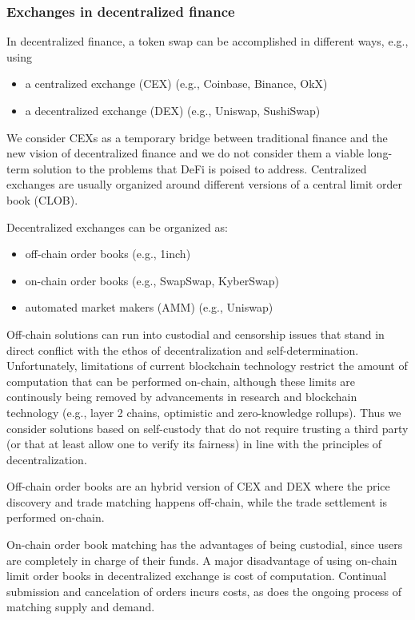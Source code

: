 \documentclass[11pt, reqno]{amsart}
\theoremstyle{definition}
\theoremstyle{remark}
\begin{document}
\subsubsection{Exchanges in decentralized finance}
In decentralized finance, a token swap can be accomplished in different ways,
e.g., using
\begin{itemize}
	\item a centralized exchange (CEX) (e.g., Coinbase, Binance, OkX)
	\item a decentralized exchange (DEX) (e.g., Uniswap, SushiSwap)
\end{itemize}

We consider CEXs as a temporary bridge between traditional finance and the
new vision of decentralized finance and we do not consider them a viable
long-term solution to the problems that DeFi is poised to address.
Centralized exchanges are usually organized around different versions of a
central limit order book (CLOB).

Decentralized exchanges can be organized as:
\begin{itemize}
	\item off-chain order books (e.g., 1inch)
	\item on-chain order books (e.g., SwapSwap, KyberSwap)
	\item automated market makers (AMM) (e.g., Uniswap)
\end{itemize}

Off-chain solutions can run into custodial and censorship issues that stand
in direct conflict with the ethos of decentralization and self-determination.
Unfortunately, limitations of current blockchain technology restrict
the amount of computation that can be performed on-chain, although these limits
are continously being removed by advancements in research and blockchain
technology (e.g., layer 2 chains, optimistic and zero-knowledge rollups).
Thus we consider solutions based on self-custody that do not require
trusting a third party (or that at least allow one to verify its fairness) in
line with the principles of decentralization.

Off-chain order books are an hybrid version of CEX and DEX where the price
discovery and trade matching happens off-chain, while the trade settlement is
performed on-chain.

On-chain order book matching has the advantages of being custodial, since users
are completely in charge of their funds.
A major disadvantage of using on-chain limit order books in decentralized
exchange is cost of computation. Continual submission and cancelation of orders
incurs costs, as does the ongoing process of matching supply and demand.
\end{document}
